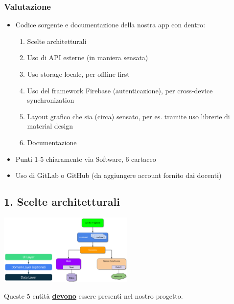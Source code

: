 \subsubsection{Valutazione}
\begin{itemize}
    \item Codice sorgente e documentazione della nostra app con dentro:
    \begin{enumerate}
        \item Scelte architetturali
        \item Uso di API esterne (in maniera sensata)
        \item Uso storage locale, per offline-first
        \item Uso del framework Firebase (autenticazione), per cross-device synchronization
        \item Layout grafico che sia (circa) sensato, per es. tramite uso librerie di material design
        \item Documentazione
    \end{enumerate}
    \item Punti 1-5 chiaramente via Software, 6 cartaceo
    \item Uso di GitLab o GitHub (da aggiungere account fornito dai docenti)
\end{itemize}

\subsection{1. Scelte architetturali}
\begin{center}
    \includegraphics[width=0.5\textwidth]{images/00_scelte_architetturali1.png}
\end{center}
\par Queste 5 entità \textbf{\underline{devono}} essere presenti nel nostro progetto.

